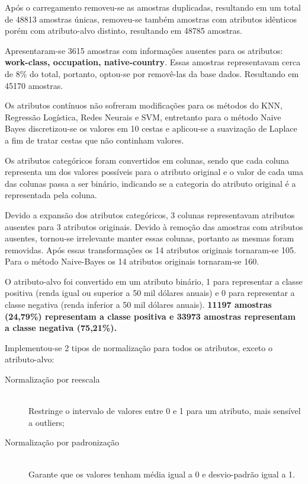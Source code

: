 Após o carregamento removeu-se as amostras duplicadas, resultando em um total de 48813 amostras únicas, removeu-se também amostras com atributos idênticos porém com atributo-alvo distinto, resultando em 48785 amostras.

Apresentaram-se 3615 amostras com informações ausentes para os atributos: \textbf{work-class, occupation, native-country}. Essas amostras representavam cerca de 8\% do total, portanto, optou-se por removê-las da base dados. Resultando em 45170 amostras.

Os atributos contínuos não sofreram modificações para os métodos do KNN, Regressão Logística, Redes Neurais e SVM, entretanto para o método Naive Bayes discretizou-se os valores em 10 cestas e aplicou-se a suavização de Laplace a fim de tratar cestas que não continham valores.

Os atributos categóricos foram convertidos em colunas, sendo que cada coluna representa um dos valores possíveis para o atributo original e o valor de cada uma das colunas passa a ser binário, indicando se a categoria do atributo original é a representada pela coluna.

Devido a expansão dos atributos categóricos, 3 colunas representavam atributos ausentes para 3 atributos originais. Devido à remoção das amostras com atributos ausentes, tornou-se irrelevante manter essas colunas, portanto as mesmas foram removidas. Após essas transformações os 14 atributos originais tornaram-se 105. Para o método Naive-Bayes os 14 atributos originais tornaram-se 160.

O atributo-alvo foi convertido em um atributo binário, 1 para representar a classe positiva (renda igual ou superior a 50 mil dólares anuais) e 0 para representar a classe negativa (renda inferior a 50 mil dólares anuais). \textbf{11197 amostras (24,79\%) representam a classe positiva e 33973 amostras representam a classe negativa (75,21\%).}

Implementou-se 2 tipos de normalização para todos os atributos, exceto o atributo-alvo:

\begin{description}
\item[Normalização por reescala] \hfill \\ Restringe o intervalo de valores entre 0 e 1 para um atributo, mais sensível a outliers;
\item[Normalização por padronização] \hfill \\ Garante que os valores tenham média igual a 0 e desvio-padrão igual a 1.
\end{description}

